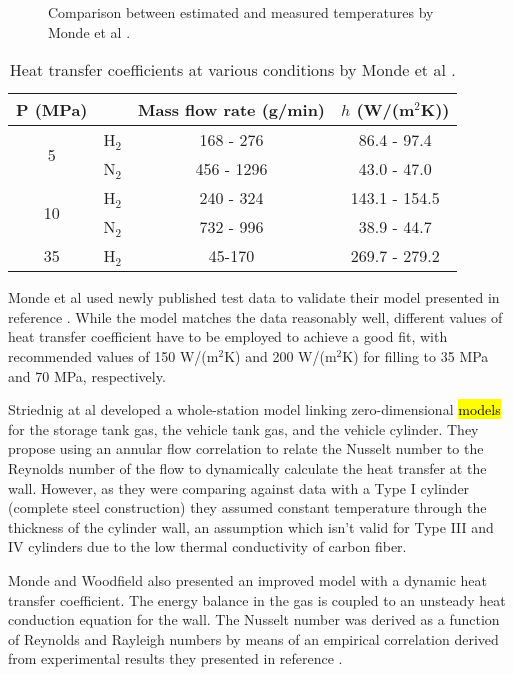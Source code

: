 \begin{figure}[H]
\begin{center}
\caption{Comparison between estimated and measured temperatures by Monde et al \cite{Monde2007}.}
\label{fig:mondeFit}
\end{center}
\end{figure}

\begin{table}[H]
\centering
\begin{small}
  \begin{tabular}{@{} cccc @{}}
    \toprule
    P (MPa) &  & Mass flow rate (g/min) & $h$ (W/(m$^2$K)) \\ 
    \midrule
     \multirow{2}{*}{5} & H$_2$ & 168 - 276 & 86.4 - 97.4 \\ 
     & N$_2$ & 456 - 1296 & 43.0 - 47.0 \\ 
     \multirow{2}{*}{10} & H$_2$& 240 - 324 & 143.1 - 154.5 \\ 
     & N$_2$  & 732 - 996 & 38.9 - 44.7 \\ 
    35 & H$_2$ & 45-170 & 269.7 - 279.2 \\ 
    \bottomrule
  \end{tabular}
\end{small}
\caption{Heat transfer coefficients at various conditions by Monde et al \cite{Monde2007}.}
\label{tab:mondeHValues}
\end{table}


Monde et al \cite{Monde2012} used newly published test data to validate their model presented in reference \cite{Monde2007}. While the model matches the data reasonably well, different values of heat transfer coefficient have to be employed to achieve a good fit, with recommended values of 150 W/(m$^2$K) and 200 W/(m$^2$K) for filling to 35 MPa and 70 MPa, respectively. 

Striednig at al \cite{Striednig2014} developed a whole-station model linking zero-dimensional \hl{models} for the storage tank gas, the vehicle tank gas, and the vehicle cylinder. They propose using an annular flow correlation to relate the Nusselt number to the Reynolds number of the flow to dynamically calculate the heat transfer at the wall. However, as they were comparing against data with a Type I cylinder (complete steel construction) they assumed constant temperature through the thickness of the cylinder wall, an assumption which isn't valid for Type III and IV cylinders due to the low thermal conductivity of carbon fiber. 

Monde and Woodfield \cite{Woodfield2010} also presented an improved model with a dynamic heat transfer coefficient. The energy balance in the gas is coupled to an unsteady heat conduction equation for the wall. The Nusselt number was derived as a function of Reynolds and Rayleigh numbers by means of an empirical correlation derived from experimental results they presented in reference \cite{Woodfield2007}.
 
